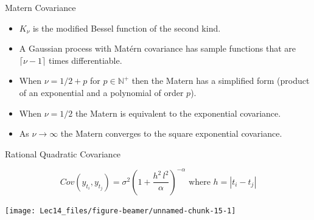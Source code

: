 \documentclass[11pt,ignorenonframetext,]{beamer}
\providecommand{\tightlist}{%
  \setlength{\itemsep}{0pt}\setlength{\parskip}{0pt}}
\begin{document}
\begin{frame}[t]{Matern Covariance}
\protect\hypertarget{matern-covariance-1}{}

\begin{itemize}
\tightlist
\item
  \(K_\nu\) is the modified Bessel function of the second kind.
\end{itemize}

\vspace{1mm}

\begin{itemize}
\tightlist
\item
  A Gaussian process with Matérn covariance has sample functions that
  are \(\lceil \nu -1\rceil\) times differentiable.
\end{itemize}

\vspace{1mm}

\begin{itemize}
\tightlist
\item
  When \(\nu = 1/2 + p\) for \(p \in \mathbb{N}^+\) then the Matern has
  a simplified form (product of an exponential and a polynomial of order
  \(p\)).
\end{itemize}

\vspace{1mm}

\begin{itemize}
\tightlist
\item
  When \(\nu = 1/2\) the Matern is equivalent to the exponential
  covariance.
\end{itemize}

\vspace{1mm}

\begin{itemize}
\tightlist
\item
  As \(\nu \to \infty\) the Matern converges to the square exponential
  covariance.
\end{itemize}

\end{frame}

\begin{frame}[t]{Rational Quadratic Covariance}
\protect\hypertarget{rational-quadratic-covariance}{}

\vspace{-5mm}

\[ Cov(y_{t_i}, y_{t_j}) = \sigma^2 \left(1 + \frac{h^2 \, l^2}{\alpha}\right)^{-\alpha} \text{   where } h = |t_i - t_j|\]

\begin{center}\texttt{[image: Lec14\_files/figure-beamer/unnamed-chunk-15-1]} \end{center}

\end{frame}
\end{document}
